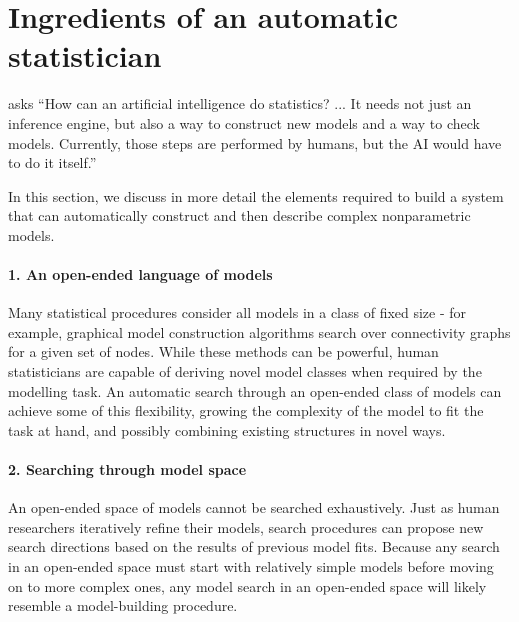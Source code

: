\documentclass[letterpaper]{article}
\begin{document}
\section{Ingredients of an automatic statistician}
\label{sec:ingredients}
\citet{gelman2013philblogpost} asks ``How can an artificial intelligence do statistics? ... It needs not just an inference engine, but also a way to construct new models and a way to check models. Currently, those steps are performed by humans, but the AI would have to do it itself.''

In this section, we discuss in more detail the elements required to build a system that can automatically construct and then describe complex nonparametric models.


\paragraph{1. An open-ended language of models}
Many statistical procedures consider all models in a class of fixed size - for example, graphical model construction algorithms search over connectivity graphs for a given set of nodes.
While these methods can be powerful, human statisticians are capable of deriving novel model classes when required by the modelling task.
An automatic search through an open-ended class of models can achieve some of this flexibility, growing the complexity of the model to fit the task at hand, and possibly combining existing structures in novel ways.

\paragraph{2. Searching through model space}
An open-ended space of models cannot be searched exhaustively.
Just as human researchers iteratively refine their models, search procedures can propose new search directions based on the results of previous model fits.
Because any search in an open-ended space must start with relatively simple models before moving on to more complex ones, any model search in an open-ended space will likely resemble a model-building procedure.%
\end{document}
